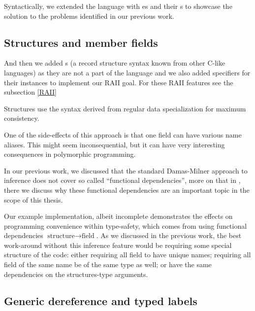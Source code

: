 Syntactically, we extended the language with es and their s to showcase the solution to the problems identified in our previous work. 



\subsection{Structures and member fields}

And then we added s (a record structure syntax known from other C-like languages) as they are not a part of the \cmm language and we also added  specifiers for their instances to implement our RAII goal. For these RAII features see the subsection \ref{RAII}

Structures use the syntax derived from regular data specialization for maximum consistency.


One of the side-effects of this approach is that one field can have various name aliases. This might seem inconsequential, but it can have very interesting consequences in polymorphic programming.




In our previous work, we discussed that the standard Damas-Milner approach to inference does not cover so called ``functional dependencies'', more on that in , there we discuss why these functional dependencies are an important topic in the scope of this thesis.

Our example implementation, albeit incomplete demonstrates the effects on programming convenience within type-safety, which comes from using functional dependencies $\text{structure} \to \text{field}$. As we discussed in the previous work, the best work-around without this inference feature would be requiring some special structure of the code: either requiring all field to have unique names; requiring all field of the same name be of the same type as well; or have the same dependencies on the structures-type arguments.


\subsection{Generic dereference and typed labels}

